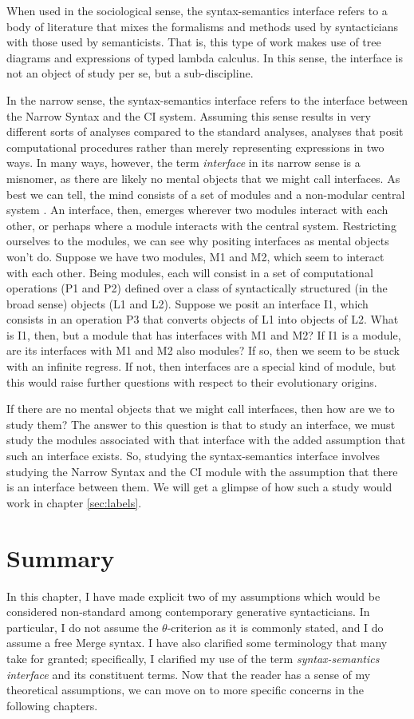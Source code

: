 \documentclass[MilwayThesis]{subfiles}
\begin{document}
When used in the sociological sense, the syntax-semantics interface refers to a body of literature that mixes the formalisms and methods used by syntacticians with those used by semanticists.
That is, this type of work makes use of tree diagrams and expressions of typed lambda calculus.
In this sense, the interface is not an object of study per se, but a sub-discipline.

In the narrow sense, the syntax-semantics interface refers to the interface between the Narrow Syntax and the CI system.
Assuming this sense results in very different sorts of analyses compared to the standard analyses, analyses that posit computational procedures rather than merely representing expressions in two ways.
In many ways, however, the term \textit{interface} in its narrow sense is a misnomer, as there are likely no mental objects that we might call interfaces.
As best we can tell, the mind consists of a set of modules and a non-modular central system \parencite{fodor1983modularity,fodor2001mind}.
An interface, then, emerges wherever two modules interact with each other, or perhaps where a module interacts with the central system.
Restricting ourselves to the modules, we can see why positing interfaces as mental objects won't do.
Suppose we have two modules, M1 and M2, which seem to interact with each other.
Being modules, each will consist in a set of computational operations (P1 and P2) defined over a class of syntactically structured (in the broad sense) objects (L1 and L2).
Suppose we posit an interface I1, which consists in an operation P3 that converts objects of L1 into objects of L2.
What is I1, then, but a module that has interfaces with M1 and M2?
If I1 is a module, are its interfaces with M1 and M2 also modules?
If so, then we seem to be stuck with an infinite regress.
If not, then interfaces are a special kind of module, but this would raise further questions with respect to their evolutionary origins.

If there are no mental objects that we might call interfaces, then how are we to study them?
The answer to this question is that to study an interface, we must study the modules associated with that interface with the added assumption that such an interface exists.
So, studying the syntax-semantics interface involves studying the Narrow Syntax and the CI module with the assumption that there is an interface between them.
We will get a glimpse of how such a study would work in chapter \ref{sec:labels}.

\section{Summary}
In this chapter, I have made explicit two of my assumptions which would be considered non-standard among contemporary generative syntacticians.
In particular, I do not assume the $\theta$-criterion as it is commonly stated, and I do assume a free Merge syntax.
I have also clarified some terminology that many take for granted; specifically, I clarified my use of the term \textit{syntax-semantics interface} and its constituent terms.
Now that the reader has a sense of my theoretical assumptions, we can move on to more specific concerns in the following chapters.
\end{document}
